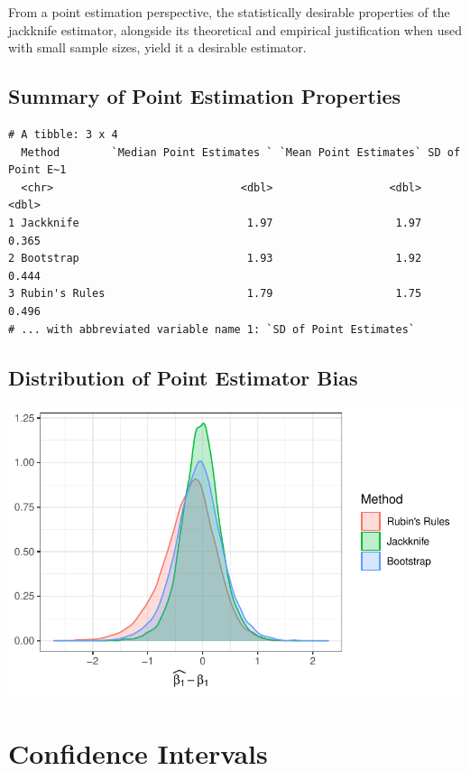 \documentclass[
  letterpaper,
  DIV=11,
  numbers=noendperiod]{scrreprt}
\begin{document}
From a point estimation perspective, the statistically desirable
properties of the jackknife estimator, alongside its theoretical and
empirical justification when used with small sample sizes, yield it a
desirable estimator.

\hypertarget{sec-point}{%
\subsection{Summary of Point Estimation Properties}\label{sec-point}}

\begin{verbatim}
# A tibble: 3 x 4
  Method        `Median Point Estimates ` `Mean Point Estimates` SD of Point E~1
  <chr>                             <dbl>                  <dbl>           <dbl>
1 Jackknife                          1.97                   1.97           0.365
2 Bootstrap                          1.93                   1.92           0.444
3 Rubin's Rules                      1.79                   1.75           0.496
# ... with abbreviated variable name 1: `SD of Point Estimates`
\end{verbatim}

\hypertarget{sec-dist}{%
\subsection{Distribution of Point Estimator Bias}\label{sec-dist}}

\includegraphics{./results_files/figure-pdf/unnamed-chunk-3-1.pdf}

\hypertarget{sec-ci}{%
\section{Confidence Intervals}\label{sec-ci}}
\end{document}
